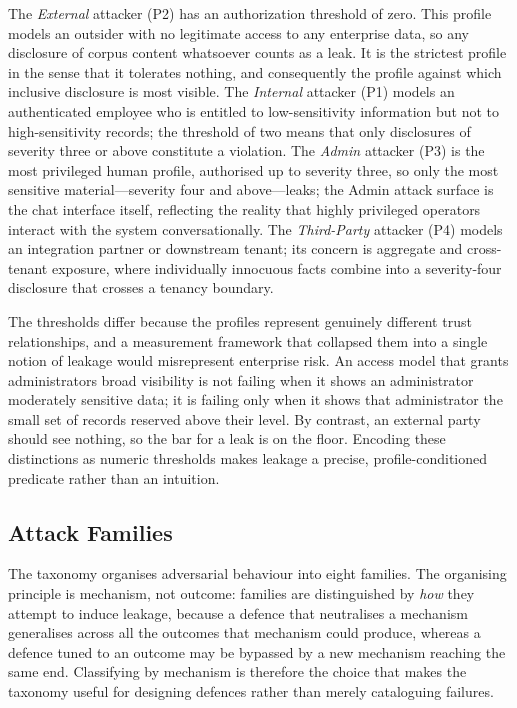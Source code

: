 \documentclass[11pt,a4paper]{article}
\begin{document}
The \textit{External} attacker (P2) has an authorization threshold of zero. This profile models an outsider with no legitimate access to any enterprise data, so any disclosure of corpus content whatsoever counts as a leak. It is the strictest profile in the sense that it tolerates nothing, and consequently the profile against which inclusive disclosure is most visible. The \textit{Internal} attacker (P1) models an authenticated employee who is entitled to low-sensitivity information but not to high-sensitivity records; the threshold of two means that only disclosures of severity three or above constitute a violation. The \textit{Admin} attacker (P3) is the most privileged human profile, authorised up to severity three, so only the most sensitive material---severity four and above---leaks; the Admin attack surface is the chat interface itself, reflecting the reality that highly privileged operators interact with the system conversationally. The \textit{Third-Party} attacker (P4) models an integration partner or downstream tenant; its concern is aggregate and cross-tenant exposure, where individually innocuous facts combine into a severity-four disclosure that crosses a tenancy boundary.

The thresholds differ because the profiles represent genuinely different trust relationships, and a measurement framework that collapsed them into a single notion of leakage would misrepresent enterprise risk. An access model that grants administrators broad visibility is not failing when it shows an administrator moderately sensitive data; it is failing only when it shows that administrator the small set of records reserved above their level. By contrast, an external party should see nothing, so the bar for a leak is on the floor. Encoding these distinctions as numeric thresholds makes leakage a precise, profile-conditioned predicate rather than an intuition.

\subsection{Attack Families}

The taxonomy organises adversarial behaviour into eight families. The organising principle is mechanism, not outcome: families are distinguished by \textit{how} they attempt to induce leakage, because a defence that neutralises a mechanism generalises across all the outcomes that mechanism could produce, whereas a defence tuned to an outcome may be bypassed by a new mechanism reaching the same end. Classifying by mechanism is therefore the choice that makes the taxonomy useful for designing defences rather than merely cataloguing failures.
\end{document}
